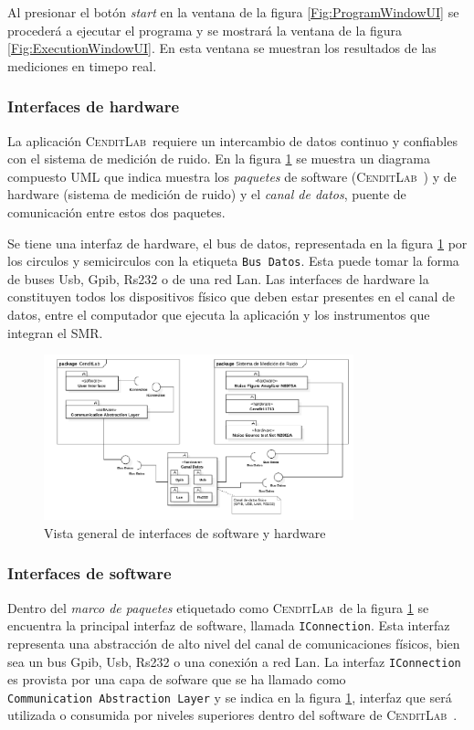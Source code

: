 \documentclass[paper=a4,oneside,fontsize=12pt]{article}
\newcommand{\AppName}{\textsc{CenditLab}\ }
\newcommand{\smr}{sistema de medición de ruido}
\newcommand{\SMR}{SMR}
\begin{document}
	Al presionar el botón \emph{start} en la ventana de la figura \ref{Fig:ProgramWindowUI} se procederá a ejecutar el programa y se mostrará la ventana de la figura \ref{Fig:ExecutionWindowUI}. En  esta ventana se muestran los resultados de las mediciones en timepo real.
	
	\subsubsection{Interfaces de hardware}
	
	La aplicación \AppName requiere un intercambio de datos continuo y confiables con el \smr. En la figura \ref{Fig:MainSystemPackagesUML} se muestra un diagrama compuesto UML que indica muestra los \emph{paquetes} de software (\AppName) y de hardware (\smr) y el \emph{canal de datos}, puente de comunicación entre estos dos paquetes.
	
	Se tiene una interfaz de hardware, el bus de datos, representada en la figura \ref{Fig:MainSystemPackagesUML} por los circulos y semicirculos con la etiqueta \texttt{Bus Datos}. Esta puede tomar la forma de buses Usb, Gpib, Rs232 o de una red Lan. Las interfaces de hardware la constituyen todos los dispositivos físico que deben estar presentes en el canal de datos, entre el computador que ejecuta la aplicación y los instrumentos que integran el \SMR.	
	
	\begin{figure}[H]
		\centering
		\includegraphics[width=0.8\textwidth]{Imagenes/MainSystemPackagesUML.pdf}
		\caption{Vista general de interfaces de software y hardware}
		\label{Fig:MainSystemPackagesUML}
	\end{figure}
	
	\subsubsection{Interfaces de software}
	
	Dentro del \emph{marco de paquetes} etiquetado como \AppName de la figura \ref{Fig:MainSystemPackagesUML} se encuentra la principal interfaz de software, llamada \texttt{IConnection}. Esta interfaz representa una abstracción de alto nivel del canal de comunicaciones físicos, bien sea un bus Gpib, Usb, Rs232 o una conexión a red Lan. La interfaz \texttt{IConnection} es provista por una capa de sofware que se ha llamado como \texttt{Communication~Abstraction~Layer} y se indica en la figura \ref{Fig:MainSystemPackagesUML}, interfaz que será utilizada o consumida por niveles superiores dentro del software de \AppName.
	
\end{document}
